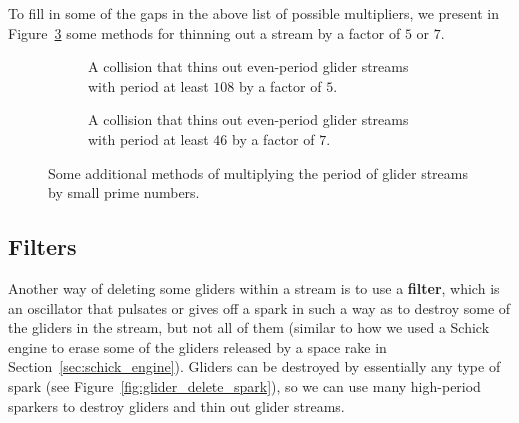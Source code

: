 To fill in some of the gaps in the above list of possible multipliers, we present in Figure~\ref{fig:glider_delete_prime} some methods for thinning out a stream by a factor of $5$ or $7$.

\begin{figure}[!htb]
	\centering
	\begin{subfigure}{.48\textwidth}
		\centering
		\caption{A collision that thins out even-period glider streams with period at least $108$ by a factor of $5$.}
		\label{fig:glider_delete4}
	\end{subfigure} \hfill %
	\begin{subfigure}{.48\textwidth}
		\centering
		\caption{A collision that thins out even-period glider streams with period at least $46$ by a factor of $7$.}
		\label{fig:glider_delete6}
	\end{subfigure}
	\caption{Some additional methods of multiplying the period of glider streams by small prime numbers.}\label{fig:glider_delete_prime}
\end{figure}


\subsection{Filters}\label{sec:filters}

Another way of deleting some gliders within a stream is to use a \textbf{filter}, which is an oscillator that pulsates or gives off a spark in such a way as to destroy some of the gliders in the stream, but not all of them (similar to how we used a Schick engine to erase some of the gliders released by a space rake in Section~\ref{sec:schick_engine}). Gliders can be destroyed by essentially any type of spark (see Figure~\ref{fig:glider_delete_spark}), so we can use many high-period sparkers to destroy gliders and thin out glider streams.

